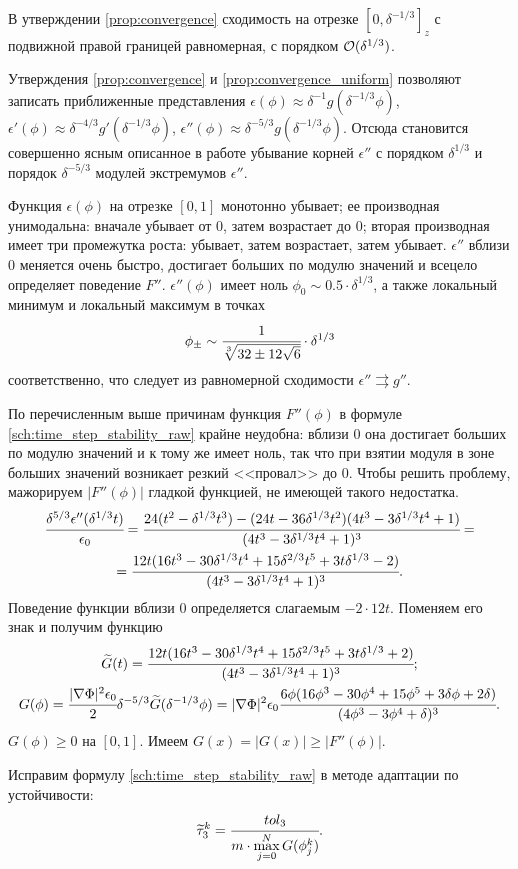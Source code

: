 \begin{proposition}
	\label{prop:convergence_uniform}
	В утверждении \ref{prop:convergence} сходимость на отрезке $[0, \delta^{-1/3}]_z$ с подвижной правой границей равномерная, с порядком ${\mathcal{O}}(\delta^{1/3})$. 
\end{proposition}

Утверждения \ref{prop:convergence} и \ref{prop:convergence_uniform} позволяют записать приближенные представления $\epsilon(\phi) \approx \delta^{-1} g(\delta^{-1/3} \phi)$, $\epsilon'(\phi) \approx \delta^{-4/3} g'(\delta^{-1/3} \phi)$, $\epsilon''(\phi) \approx \delta^{-5/3} g(\delta^{-1/3} \phi)$. Отсюда становится совершенно ясным описанное в работе \cite{ponomarev_stability} убывание корней $\epsilon''$ с порядком $\delta^{1/3}$ и порядок $\delta^{-5/3}$ модулей экстремумов $\epsilon''$.

Функция $\epsilon(\phi)$ на отрезке $[0, 1]$ монотонно убывает; ее производная унимодальна: вначале убывает от $0$, затем возрастает до $0$; вторая производная имеет три промежутка роста: убывает, затем возрастает, затем убывает. $\epsilon''$ вблизи $0$ меняется очень быстро, достигает больших по модулю значений и всецело определяет поведение $F''$. $\epsilon''(\phi)$ имеет ноль $\phi_0 \sim 0.5 \cdot \delta^{1/3}$, а также локальный минимум и локальный максимум в точках
\[
	\phi_\pm \sim \cfrac{1}{\sqrt[3]{32 \pm 12 \sqrt{6}}} \cdot \delta^{1/3}
\]
соответственно, что следует из равномерной сходимости $\epsilon'' \rightrightarrows g''$.

По перечисленным выше причинам функция $F''(\phi)$ в формуле \eqref{sch:time_step_stability_raw} крайне неудобна: вблизи $0$ она достигает больших по модулю значений и к тому же имеет ноль, так что при взятии модуля в зоне больших значений возникает резкий <<провал>> до $0$. Чтобы решить проблему, мажорируем $|F''(\phi)|$ гладкой функцией, не имеющей такого недостатка.
\begin{multline*}
	\cfrac{\delta^{5/3} \epsilon''(\delta^{1/3} t)}{\epsilon_0} = \cfrac{24 (t^2 - \delta^{1/3} t^3) - (24 t - 36 \delta^{1/3} t^2)(4 t^3 - 3 \delta^{1/3} t^4 + 1)}{(4 t^3 - 3 \delta^{1/3} t^4 + 1)^3} = \\
	= \cfrac{12t (16 t^3 - 30 \delta^{1/3} t^4 + 15 \delta^{2/3} t^5 + 3t \delta^{1/3} - 2)}{(4 t^3 - 3 \delta^{1/3} t^4 + 1)^3}.
\end{multline*}
Поведение функции вблизи $0$ определяется слагаемым $-2 \cdot 12t$. Поменяем его знак и получим функцию
\begin{gather*}
	\widetilde{G}(t) = \cfrac{12t (16 t^3 - 30 \delta^{1/3} t^4 + 15 \delta^{2/3} t^5 + 3t \delta^{1/3} + 2)}{(4 t^3 - 3 \delta^{1/3} t^4 + 1)^3}; \\
	G(\phi) = \cfrac{|\nabla \Phi|^2 \epsilon_0}{2} \delta^{-5/3} \widetilde{G}(\delta^{-1/3} \phi) = |\nabla \Phi|^2 \epsilon_0 \cfrac{6 \phi (16 \phi^3 - 30 \phi^4 + 15 \phi^5 + 3 \delta \phi + 2 \delta)}{(4 \phi^3 - 3 \phi^4 + \delta)^3}.
\end{gather*}
$G(\phi) \geqslant 0$ на $[0, 1]$. Имеем $G(x) = |G(x)| \geqslant |F''(\phi)|$.

Исправим формулу \eqref{sch:time_step_stability_raw} в методе адаптации по устойчивости:
\begin{equation}
	\widetilde{\tau}_3^k = \cfrac{tol_3}{m \cdot \max\limits_{j = 0}^N G(\phi_j^k)}.
	\label{sch:time_step_stability}
\end{equation}